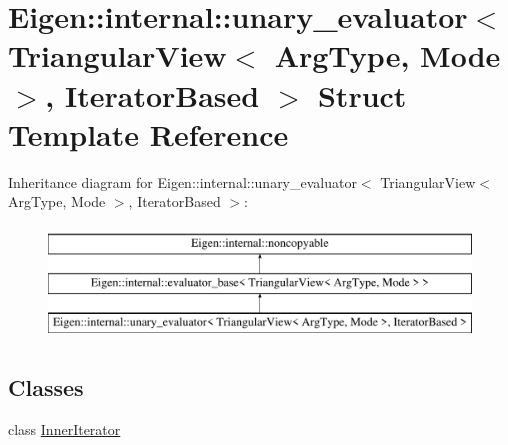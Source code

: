 \hypertarget{struct_eigen_1_1internal_1_1unary__evaluator_3_01_triangular_view_3_01_arg_type_00_01_mode_01_4_00_01_iterator_based_01_4}{}\section{Eigen\+::internal\+::unary\+\_\+evaluator$<$ Triangular\+View$<$ Arg\+Type, Mode $>$, Iterator\+Based $>$ Struct Template Reference}
\label{struct_eigen_1_1internal_1_1unary__evaluator_3_01_triangular_view_3_01_arg_type_00_01_mode_01_4_00_01_iterator_based_01_4}
Inheritance diagram for Eigen\+::internal\+::unary\+\_\+evaluator$<$ Triangular\+View$<$ Arg\+Type, Mode $>$, Iterator\+Based $>$\+:\begin{figure}[H]
\begin{center}
\leavevmode
\includegraphics[height=3.000000cm]{struct_eigen_1_1internal_1_1unary__evaluator_3_01_triangular_view_3_01_arg_type_00_01_mode_01_4_00_01_iterator_based_01_4}
\end{center}
\end{figure}
\subsection*{Classes}
\begin{DoxyCompactItemize}
\item 
class \mbox{\hyperlink{class_eigen_1_1internal_1_1unary__evaluator_3_01_triangular_view_3_01_arg_type_00_01_mode_01_4_0e8ca4efc3cb45e07bfa597fdc256f969}{Inner\+Iterator}}
\end{DoxyCompactItemize}
